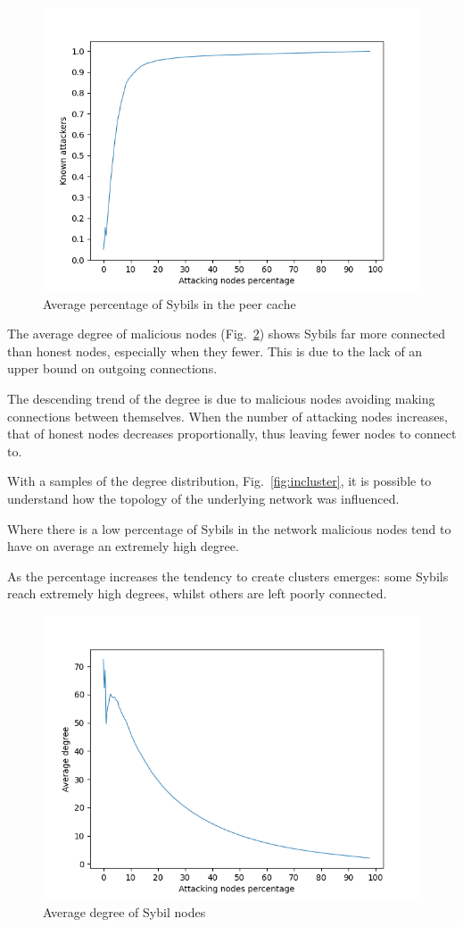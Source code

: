\begin{figure}[h!]
	\includegraphics[width=.7\textwidth]{pict/results/in-hon-avg-known-atk.png}
	\centering
	\caption{Average percentage of Sybils in the peer cache}
	\label{fig:avgatk-known}
\end{figure}

The average degree of malicious nodes (Fig.~\ref{fig:in-atk-degree}) shows Sybils far more connected than honest nodes, especially when they fewer. This is due to the lack of an upper bound on outgoing connections.

The descending trend of the degree is due to malicious nodes avoiding making connections between themselves. When the number of attacking nodes increases, that of honest nodes decreases proportionally, thus leaving fewer nodes to connect to.

With a samples of the degree distribution, Fig.~\ref{fig:incluster}, it is possible to understand how the topology of the underlying network was influenced. 

Where there is a low percentage of Sybils in the network malicious nodes tend to have on average an extremely high degree.

As the percentage increases the tendency to create clusters emerges: some Sybils reach extremely high degrees, whilst others are left poorly connected.\\
\begin{figure}[h!]
	\includegraphics[width=.7\textwidth]{pict/results/in-atk-avg-degree.png}
	\centering
	\caption{Average degree of Sybil nodes}
	\label{fig:in-atk-degree}
\end{figure}

